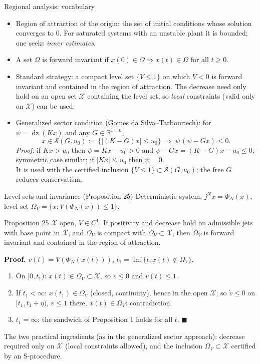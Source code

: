 \documentclass[10pt,aspectratio=169]{beamer}
\newcommand{\R}{\mathbb{R}}
\newcommand{\dz}{\operatorname{dz}}
\begin{document}
\begin{frame}{Regional analysis: vocabulary}
\begin{itemize}
\item \alert{Region of attraction} of the origin: the set of initial conditions whose solution converges to $0$. For saturated systems with an unstable plant it is bounded; one seeks \emph{inner estimates}.
\item A set $\Omega$ is \alert{forward invariant} if $x(0)\in\Omega\Rightarrow x(t)\in\Omega$ for all $t\ge0$.
\item Standard strategy: a compact level set $\{V\le1\}$ on which $\dot V<0$ is forward invariant and contained in the region of attraction. The decrease need only hold on an open set $\mathcal X$ containing the level set, so \emph{local} constraints (valid only on $\mathcal X$) can be used.
\item \alert{Generalized sector condition} (Gomes da Silva--Tarbouriech): for $\psi=\dz(Kx)$ and any $G\in\R^{1\times n}$,
\[
x\in\mathcal S(G,u_0):=\{|(K-G)x|\le u_0\}\ \Longrightarrow\ \psi\,(\psi-Gx)\le0 .
\]
\emph{Proof}: if $Kx>u_0$ then $\psi=Kx-u_0>0$ and $\psi-Gx=(K-G)x-u_0\le0$; symmetric case similar; if $|Kx|\le u_0$ then $\psi=0$.\\
It is used with the certified inclusion $\{V\le1\}\subset\mathcal S(G,u_0)$; the free $G$ reduces conservatism.
\end{itemize}
\end{frame}

\begin{frame}{Level sets and invariance (Proposition 25)}
Deterministic system, $j^Nx=\Phi_N(x)$, level set $\Omega_V=\{x:V(\Phi_N(x))\le1\}$.
\begin{block}{Proposition 25}
$\mathcal X$ open, $V\in C^1$. If positivity and decrease hold on admissible jets with base point in $\mathcal X$, and $\Omega_V$ is compact with $\Omega_V\subset\mathcal X$, then $\Omega_V$ is forward invariant and contained in the region of attraction.
\end{block}
\textbf{Proof.} $v(t)=V(\Phi_N(x(t)))$, $t_1=\inf\{t:x(t)\notin\Omega_V\}$.
\begin{enumerate}
\item On $[0,t_1)$: $x(t)\in\Omega_V\subset\mathcal X$, so $\dot v\le0$ and $v(t)\le1$.
\item If $t_1<\infty$: $x(t_1)\in\Omega_V$ (closed, continuity), hence in the open $\mathcal X$; so $\dot v\le0$ on $[t_1,t_1+\eta)$, $v\le1$ there, $x(t)\in\Omega_V$: contradiction.
\item $t_1=\infty$; the sandwich of Proposition 1 holds for all $t$. $\blacksquare$
\end{enumerate}
\medskip
The two practical ingredients (as in the generalized sector approach): decrease required only on $\mathcal X$ (local constraints allowed), and the inclusion $\Omega_V\subset\mathcal X$ certified by an S-procedure.
\end{frame}
\end{document}

